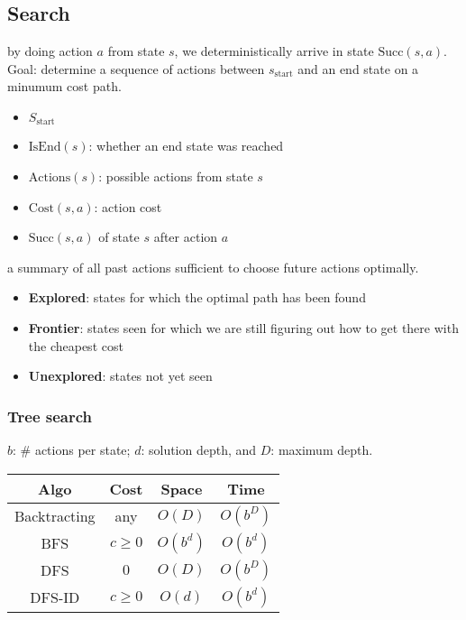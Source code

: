 \subsection{Search}

 by doing action $a$ from state $s$, we deterministically
arrive in state $\text{Succ}(s,a)$. Goal: determine a sequence of actions
between $s_{\text{start}}$ and an end state on a minumum cost path.
\begin{itemize}
    \item $S_\text{start}$
    \item $\text{IsEnd}(s)$: whether an end state was reached
    \item $\text{Actions}(s)$: possible actions from state $s$
    \item $\text{Cost}(s,a)$: action cost
    \item $\text{Succ}(s,a)$ of state $s$ after action $a$
\end{itemize}

 a summary of all past actions sufficient to choose future actions optimally.

\begin{itemize}
    \item \textbf{Explored}: states for which the optimal path has been found
    \item \textbf{Frontier}: states seen for which we are still figuring out how to get there with the cheapest cost
    \item \textbf{Unexplored}: states not yet seen
\end{itemize}

\subsubsection{Tree search}

 $b$: \# actions per state; $d$: solution depth, and $D$:
maximum depth.
\begin{tabular}{|c|c|c|c|} 
    \hline
    \textbf{Algo}  & \textbf{Cost} & \textbf{Space} & \textbf{Time} \\
    \hline
    Backtracting & any & $O(D)$ & $O(b^D)$ \\ 
    \hline
    BFS & $c \ge 0$ & $O(b^d)$ & $O(b^d)$ \\
    \hline
    DFS & $0$ & $O(D)$ & $O(b^D)$ \\
    \hline
    DFS-ID & $c \ge 0$ & $O(d)$ & $O(b^d)$ \\
    \hline
\end{tabular}


